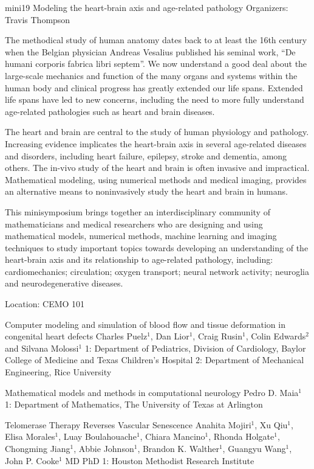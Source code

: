 \mini
{mini19}
{Modeling the heart-brain axis and age-related pathology}
{Organizers: Travis Thompson}
{The methodical study of human anatomy dates back to at least the 16th century when the Belgian physician Andreas Vesalius published his seminal work, ``De humani corporis fabrica libri septem''.  We now understand a good deal about the large-scale mechanics and function of the many organs and systems within the human body and clinical progress has greatly extended our life spans.  Extended life spans have led to new concerns, including the need to more fully understand age-related pathologies such as heart and brain diseases.

The heart and brain are central to the study of human physiology and pathology.  Increasing evidence implicates the heart-brain axis in several age-related diseases and disorders, including heart failure, epilepsy, stroke and dementia, among others.  The in-vivo study of the heart and brain is often invasive and impractical.  Mathematical modeling, using numerical methods and medical imaging, provides an alternative means to noninvasively study the heart and brain in humans.

This minisymposium brings together an interdisciplinary community of mathematicians and medical researchers who are designing and using mathematical models, numerical methods, machine learning and imaging techniques to study important topics towards developing an understanding of the heart-brain axis and its relationship to age-related pathology, including: cardiomechanics; circulation; oxygen transport; neural network activity; neuroglia and neurodegenerative diseases.}
{Location: CEMO 101}

\begin{talks}
\item\talk
{Computer modeling and simulation of blood flow and tissue deformation in congenital heart defects}
{Charles Puelz$^{1}$, Dan Lior$^{1}$, Craig Rusin$^{1}$, Colin Edwards$^{2}$ and Silvana Molossi$^{1}$}
{1: Department of Pediatrics, Division of Cardiology, Baylor College of Medicine and Texas Children's Hospital 2: Department of Mechanical Engineering, Rice University}
\item\talk
{Mathematical models and methods in computational neurology}
{Pedro D. Maia$^{1}$}
{1: Department of Mathematics, The University of Texas at Arlington}
\item\talk
{Telomerase Therapy Reverses Vascular Senescence}
{Anahita Mojiri$^{1}$, Xu Qiu$^{1}$, Elisa Morales$^{1}$, Luay Boulahouache$^{1}$, Chiara Mancino$^{1}$, Rhonda Holgate$^{1}$, Chongming Jiang$^{1}$, Abbie Johnson$^{1}$, Brandon K. Walther$^{1}$, Guangyu Wang$^{1}$, John P. Cooke$^{1}$ MD PhD}
{1: Houston Methodist Research Institute}
\end{talks}
\room
